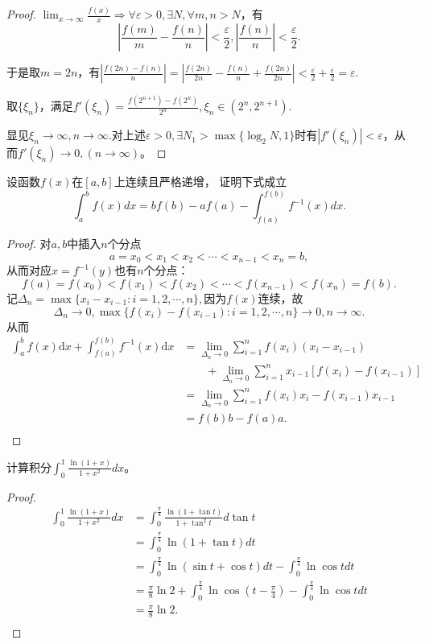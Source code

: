  \begin{proof}
  $\lim_{x\rightarrow\infty}\frac{f(x)}{x}\Longrightarrow\forall\varepsilon>0,\exists N,\forall m,n>N$，有$$|\frac{f(m)}{m}-\frac{f(n)}{n}|<\frac{\varepsilon}{2},|\frac{f(n)}n|<\frac{\varepsilon}{2}.$$
  
  于是取$m=2n$，有$|\frac{f(2n)-f(n)}{n}|=|\frac{f(2n)}{2n}-\frac{f(n)}{n}+\frac{f(2n)}{2n}|<\frac{\varepsilon}{2}+\frac{\varepsilon}{2}=\varepsilon.$
  
  取$\{\xi_n\}$，满足$f'(\xi_n)=\frac{f(2^{n+1})-f(2^n)}{2^n},\xi_n\in(2^n,2^{n+1}).$
  
  显见$\xi_n\rightarrow\infty,n\rightarrow\infty.$对上述$\varepsilon>0,\exists N_1>\max\{\log_2N,1\}$时有$|f'(\xi_n)|<\varepsilon$，从而$f'(\xi_n)\rightarrow0,(n\rightarrow\infty)$。
  \end{proof}

  \begin{example}
  设函数$f(x)$在$[a,b]$上连续且严格递增，
  证明下式成立$$\int_a^bf(x)dx=bf(b)-af(a)-\int_{f(a)}^{f(b)}f^{-1}(x)dx.$$
  \end{example}

  \begin{proof}
对$a,b$中插入$n$个分点$$a=x_0<x_1<x_2<\cdots<x_{n-1}<x_n=b,$$
从而对应$x=f^{-1}(y)$也有$n$个分点：
$$f(a)=f(x_0)<f(x_1)<f(x_2)<\cdots<f(x_{n-1})<f(x_n)=f(b).$$
记$\Delta_n=\max\{x_i-x_{i-1}:i=1,2,\cdots,n\},$因为$f(x)$连续，故
$$\Delta_n\rightarrow0,\max\{f(x_i)-f(x_{i-1}):i=1,2,\cdots,n\}\rightarrow0,n\rightarrow\infty.$$
从而
\begin{align*}
\int_a^bf(x)\mathrm{d}x+\int_{f(a)}^{f(b)}f^{-1}(x)\mathrm{d}x&=\lim_{\Delta_n\rightarrow0}\sum_{i=1}^nf(x_i)(x_i-x_{i-1})\\
&\qquad+\lim_{\Delta_n\rightarrow0}\sum_{i=1}^nx_{i-1}[f(x_i)-f(x_{i-1})]\\
&=\lim_{\Delta_n\rightarrow0}\sum_{i=1}^nf(x_i)x_i-f(x_{i-1})x_{i-1}\\
&=f(b)b-f(a)a.\\
\end{align*}
\end{proof}

\begin{example}
计算积分$\int_0^1\frac{\ln(1+x)}{1+x^2}dx$。
\end{example}

\begin{proof}
  \begin{align*}
  \int_0^1\frac{\ln(1+x)}{1+x^2}dx&=\int_0^{\frac{\pi}{4}}\frac{\ln(1+\tan t)}{1+\tan^2t}d\tan t\\
  &=\int_0^{\frac{\pi}{4}}\ln(1+\tan t)dt\\
  &=\int_0^{\frac{\pi}{4}}\ln(\sin t+\cos t)dt-\int_0^{\frac{\pi}{4}}\ln\cos tdt\\
  &=\frac{\pi}{8}\ln2+\int_0^{\frac{\pi}{4}}\ln\cos(t-\frac{\pi}{4})-\int_0^{\frac{\pi}{4}}\ln\cos tdt\\
  &=\frac{\pi}{8}\ln2.\\
  \end{align*}
\end{proof}

